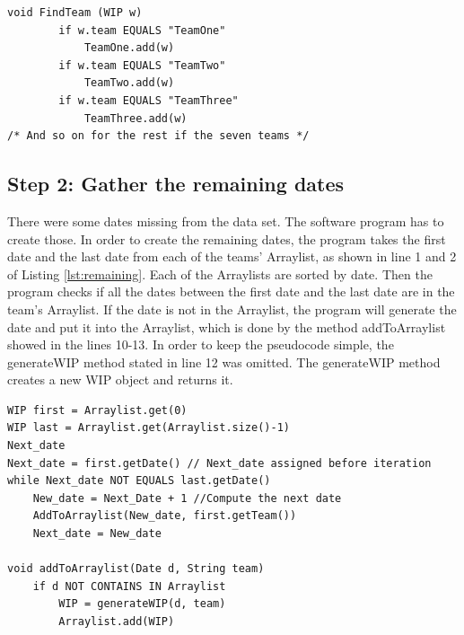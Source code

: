 \documentclass[UKenglish]{ifimaster}  %
\begin{document}
 
 \begin{lstlisting}[caption={Gather WIP object to the right data structure},label={lst:addWIP}]
void FindTeam (WIP w) 
		if w.team EQUALS "TeamOne"
			TeamOne.add(w)
		if w.team EQUALS "TeamTwo"
			TeamTwo.add(w)
		if w.team EQUALS "TeamThree"
			TeamThree.add(w)			
/* And so on for the rest if the seven teams */
 \end{lstlisting}
 
 
\subsection{Step 2: Gather the remaining dates}
 \label{sub:stepTwo}
There were some dates missing from the data set. The software program has to create those. In order to create the remaining dates, the program takes the first date and the last date from each of the teams' Arraylist, as shown in line 1 and 2 of Listing \ref{lst:remaining}. Each of the Arraylists are sorted by date. Then the program checks if all the dates between the first date and the last date are in the team's Arraylist. If the date is not in the Arraylist, the program will generate the date and put it into the Arraylist, which is done by the method addToArraylist showed in the lines 10-13. 
In order to keep the pseudocode simple, the generateWIP method stated in line 12 was omitted. The generateWIP method creates a new WIP object and returns it.

\begin{lstlisting}[caption={Gather the remaining dates.},label={lst:remaining}]
WIP first = Arraylist.get(0)
WIP last = Arraylist.get(Arraylist.size()-1)
Next_date 
Next_date = first.getDate() // Next_date assigned before iteration
while Next_date NOT EQUALS last.getDate()
	New_date = Next_Date + 1 //Compute the next date
	AddToArraylist(New_date, first.getTeam())
	Next_date = New_date

void addToArraylist(Date d, String team)
	if d NOT CONTAINS IN Arraylist
		WIP = generateWIP(d, team)
		Arraylist.add(WIP) 
 \end{lstlisting}
\end{document}
